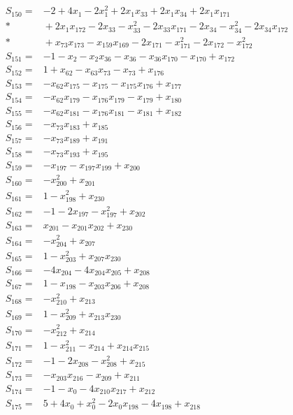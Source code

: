 \begin{align*}
S_{150}={}&-2+4x_{1}-2x_{1}^{2}+2x_{1}x_{33}+2x_{1}x_{34}+2x_{1}x_{171}\\*
&{}+2x_{1}x_{172}-2x_{33}-x_{33}^{2}-2x_{33}x_{171}-2x_{34}-x_{34}^{2}-2x_{34}x_{172}\\*
&{}+x_{73}x_{173}-x_{159}x_{169}-2x_{171}-x_{171}^{2}-2x_{172}-x_{172}^{2}\\[3pt]
S_{151}={}&-1-x_{2}-x_{2}x_{36}-x_{36}-x_{36}x_{170}-x_{170}+x_{172}\\[3pt]
S_{152}={}&1+x_{62}-x_{63}x_{73}-x_{73}+x_{176}\\[3pt]
S_{153}={}&-x_{62}x_{175}-x_{175}-x_{175}x_{176}+x_{177}\\[3pt]
S_{154}={}&-x_{62}x_{179}-x_{176}x_{179}-x_{179}+x_{180}\\[3pt]
S_{155}={}&-x_{62}x_{181}-x_{176}x_{181}-x_{181}+x_{182}\\[3pt]
S_{156}={}&-x_{73}x_{183}+x_{185}\\[3pt]
S_{157}={}&-x_{73}x_{189}+x_{191}\\[3pt]
S_{158}={}&-x_{73}x_{193}+x_{195}\\[3pt]
S_{159}={}&-x_{197}-x_{197}x_{199}+x_{200}\\[3pt]
S_{160}={}&-x_{200}^{2}+x_{201}\\[3pt]
S_{161}={}&1-x_{198}^{2}+x_{230}\\[3pt]
S_{162}={}&-1-2x_{197}-x_{197}^{2}+x_{202}\\[3pt]
S_{163}={}&x_{201}-x_{201}x_{202}+x_{230}\\[3pt]
S_{164}={}&-x_{204}^{2}+x_{207}\\[3pt]
S_{165}={}&1-x_{203}^{2}+x_{207}x_{230}\\[3pt]
S_{166}={}&-4x_{204}-4x_{204}x_{205}+x_{208}\\[3pt]
S_{167}={}&1-x_{198}-x_{203}x_{206}+x_{208}\\[3pt]
S_{168}={}&-x_{210}^{2}+x_{213}\\[3pt]
S_{169}={}&1-x_{209}^{2}+x_{213}x_{230}\\[3pt]
S_{170}={}&-x_{212}^{2}+x_{214}\\[3pt]
S_{171}={}&1-x_{211}^{2}-x_{214}+x_{214}x_{215}\\[3pt]
S_{172}={}&-1-2x_{208}-x_{208}^{2}+x_{215}\\[3pt]
S_{173}={}&-x_{203}x_{216}-x_{209}+x_{211}\\[3pt]
S_{174}={}&-1-x_{0}-4x_{210}x_{217}+x_{212}\\[3pt]
S_{175}={}&5+4x_{0}+x_{0}^{2}-2x_{0}x_{198}-4x_{198}+x_{218}\\[3pt]

\end{align*}
